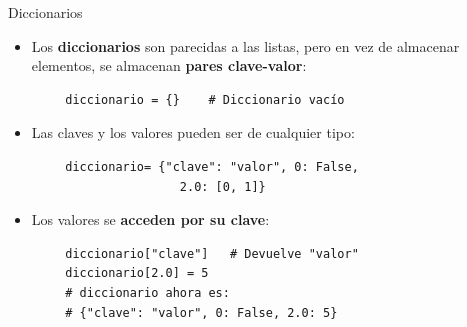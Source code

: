 \documentclass[10pt]{beamer} %
\begin{document}
\begin{frame}[fragile]{Diccionarios}
    \begin{itemize}
        \item Los \textbf{diccionarios} son parecidas a las listas, pero en vez de almacenar elementos, se almacenan \textbf{pares clave-valor}:
    \end{itemize}
    \begin{verbatim}
        diccionario = {}    # Diccionario vacío
    \end{verbatim}
    \begin{itemize}
        \item Las claves y los valores pueden ser de cualquier tipo:
    \end{itemize}
    \begin{verbatim}
        diccionario= {"clave": "valor", 0: False,
                        2.0: [0, 1]}
    \end{verbatim}
    \begin{itemize}
        \item Los valores se \textbf{acceden por su clave}:
    \end{itemize}
    \begin{verbatim}
        diccionario["clave"]   # Devuelve "valor"
        diccionario[2.0] = 5
        # diccionario ahora es:
        # {"clave": "valor", 0: False, 2.0: 5}
    \end{verbatim}
\end{frame}
\end{document}
